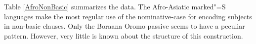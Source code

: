 



Table \ref{AfroNonBasic} summarizes the data. 
The Afro-Asiatic marked"=S languages make the most regular use of the nominative-case for encoding subjects in non-basic clauses. 
Only the Boraana Oromo passive seems to have a peculiar pattern.
However, very little is known about the structure of this construction. 

